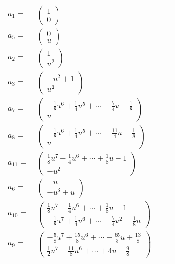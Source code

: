 \documentclass[1p]{elsarticle_modified}
\theoremstyle{definition}
\begin{document}
\begin{tabular}{m{7pt} m{180pt} m{7pt} m{180pt} }
\flushright $a_{1}=$&$\begin{pmatrix}1\\0\end{pmatrix}$ \\
\flushright $a_{5}=$&$\begin{pmatrix}0\\u\end{pmatrix}$ \\
\flushright $a_{2}=$&$\begin{pmatrix}1\\u^2\end{pmatrix}$ \\
\flushright $a_{3}=$&$\begin{pmatrix}- u^2+1\\u^2\end{pmatrix}$ \\
\flushright $a_{7}=$&$\begin{pmatrix}-\frac{1}{8} u^6+\frac{1}{4} u^5+\cdots-\frac{7}{4} u-\frac{1}{8}\\u\end{pmatrix}$ \\
\flushright $a_{8}=$&$\begin{pmatrix}-\frac{1}{8} u^6+\frac{1}{4} u^5+\cdots-\frac{11}{4} u-\frac{1}{8}\\u\end{pmatrix}$ \\
\flushright $a_{11}=$&$\begin{pmatrix}\frac{1}{8} u^7-\frac{1}{4} u^6+\cdots+\frac{1}{8} u+1\\- u^2\end{pmatrix}$ \\
\flushright $a_{6}=$&$\begin{pmatrix}- u\\- u^3+u\end{pmatrix}$ \\
\flushright $a_{10}=$&$\begin{pmatrix}\frac{1}{8} u^7-\frac{1}{4} u^6+\cdots+\frac{1}{8} u+1\\-\frac{1}{8} u^7+\frac{1}{4} u^6+\cdots-\frac{7}{4} u^2-\frac{1}{8} u\end{pmatrix}$ \\
\flushright $a_{9}=$&$\begin{pmatrix}-\frac{5}{8} u^7+\frac{15}{8} u^6+\cdots-\frac{65}{8} u+\frac{13}{8}\\\frac{1}{2} u^7-\frac{11}{8} u^6+\cdots+4 u-\frac{9}{8}\end{pmatrix}$ \\

\end{tabular}
\end{document}
